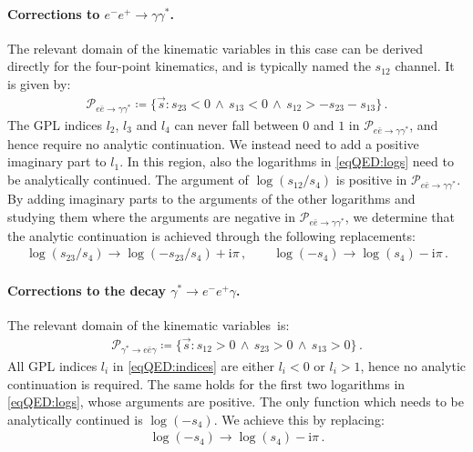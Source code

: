 \documentclass[main.tex]{subfiles}
\begin{document}
\smallskip

\paragraph{Corrections to $e^- e^+ \to \gamma \gamma^*$.} The relevant domain of the kinematic variables in this case can be derived directly for the four-point kinematics, and is typically named the $s_{12}$ channel. It is given by:
\begin{align}
\label{eq:region_eebar}
\mathcal{P}_{e\bar{e}\to\gamma\gamma^*} \coloneqq \{\vec{s} \colon s_{23} < 0 \, \land \, s_{13} < 0 \, \land \, s_{12} > - s_{23} - s_{13} \} \,.
\end{align}
The GPL indices $l_2$, $l_3$ and $l_4$ can never fall between $0$ and $1$ in $\mathcal{P}_{e\bar{e}\to\gamma\gamma^*}$, and hence require no analytic continuation. We instead need to add a positive imaginary part to $l_1$. 
In this region, also the logarithms in \cref{eqQED:logs} need to be analytically continued. The argument of $\log(s_{12}/s_4)$ is positive in $\mathcal{P}_{e\bar{e}\to\gamma\gamma^*}$. By adding imaginary parts to the arguments of the other logarithms and studying them where the arguments are negative in $\mathcal{P}_{e\bar{e}\to\gamma\gamma^*}$, we determine that the analytic continuation is achieved through the following replacements:
\begin{align}
\log(s_{23}/s_4) \longrightarrow \log(-s_{23}/s_{4})+ \mathrm{i} \pi \,, \qquad  \log(-s_4) \longrightarrow \log(s_4)- \mathrm{i} \pi \,.
\end{align}


\paragraph{Corrections to the decay $\gamma^* \to e^- e^+ \gamma$.} The relevant domain of the kinematic variables~is:
\begin{align}
\label{eq:region_decay}
\mathcal{P}_{\gamma^*\to e \bar{e} \gamma} \coloneqq  \{ \vec{s} \colon s_{12} > 0 \, \land \, s_{23} > 0 \, \land \,  s_{13} > 0 \} \,.
\end{align}
All GPL indices $l_i$ in \cref{eqQED:indices} are either $l_i < 0$ or $l_i > 1$, hence no analytic continuation is required. The same holds for the first two logarithms in \cref{eqQED:logs}, whose arguments are positive. The only function which needs to be analytically continued is $\log(-s_4)$. We achieve this by replacing:
\begin{align}
\log(-s_4) \longrightarrow \log(s_{4}) - \mathrm{i} \pi \,.
\end{align}
\end{document}
